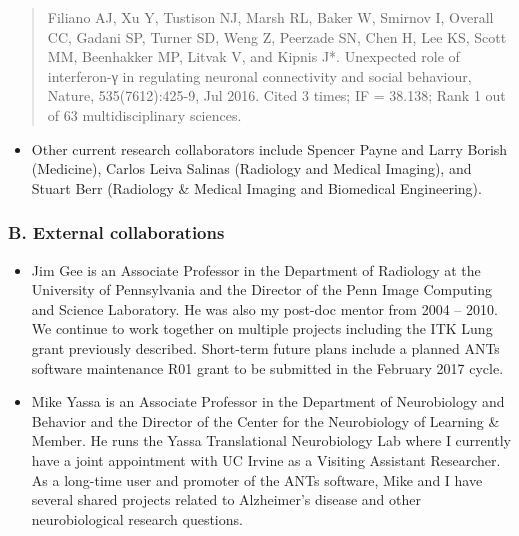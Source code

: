 \documentclass[11pt,]{article}
\providecommand{\tightlist}{%
  \setlength{\itemsep}{0pt}\setlength{\parskip}{0pt}}
\begin{document}
\begin{itemize}
  \begin{quote}
  Filiano AJ, Xu Y, Tustison NJ, Marsh RL, Baker W, Smirnov I, Overall
  CC, Gadani SP, Turner SD, Weng Z, Peerzade SN, Chen H, Lee KS, Scott
  MM, Beenhakker MP, Litvak V, and Kipnis J*. Unexpected role of
  interferon-γ in regulating neuronal connectivity and social behaviour,
  Nature, 535(7612):425-9, Jul 2016. Cited 3 times; IF = 38.138; Rank 1
  out of 63 multidisciplinary sciences.
  \end{quote}

  \begin{itemize}
  \tightlist
  \item
    Other current research collaborators include Spencer Payne and Larry
    Borish (Medicine), Carlos Leiva Salinas (Radiology and Medical
    Imaging), and Stuart Berr (Radiology \& Medical Imaging and
    Biomedical Engineering).
  \end{itemize}
\end{itemize}

\subsubsection{B. External
collaborations}\label{b.-external-collaborations}

\begin{itemize}
\item
  Jim Gee is an Associate Professor in the Department of Radiology at
  the University of Pennsylvania and the Director of the Penn Image
  Computing and Science Laboratory. He was also my post-doc mentor from
  2004 -- 2010. We continue to work together on multiple projects
  including the ITK Lung grant previously described. Short-term future
  plans include a planned ANTs software maintenance R01 grant to be
  submitted in the February 2017 cycle.
\item
  Mike Yassa is an Associate Professor in the Department of Neurobiology
  and Behavior and the Director of the Center for the Neurobiology of
  Learning \& Member. He runs the Yassa Translational Neurobiology Lab
  where I currently have a joint appointment with UC Irvine as a
  Visiting Assistant Researcher. As a long-time user and promoter of the
  ANTs software, Mike and I have several shared projects related to
  Alzheimer's disease and other neurobiological research questions.
\end{itemize}
\end{document}
